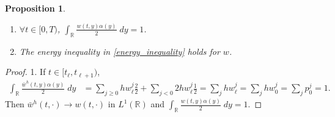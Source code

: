 \documentclass[a4paper,11pt]{article}
\newtheorem{proposition}{Proposition}[section]
\theoremstyle{remark}
\begin{document}
\begin{proposition}
\begin{enumerate}
 \item $\forall t\in[0,T)$, $\int_\mathbb{R} \frac{w(t,y)\alpha(y)}{2}\;dy = 1$.
 \item The energy inequality in \eqref{energy_inequality} holds for $w$.
\end{enumerate}
\end{proposition}
\begin{proof}
1. If $t\in [t_\ell, t_{\ell+1})$,
\begin{align*}
\int_\mathbb{R} \frac{\bar{w}^h(t,y)\alpha(y)}{2} \; dy &= \sum_{j\ge0} h w^j_\ell \frac{2}{2} + \sum_{j<0} 2h w^j_\ell \frac{1}{2} = \sum_j h w^j_\ell = \sum_j h w^j_0=\sum_j p^j_0 = 1. 
\end{align*}
Then $\bar{w}^h(t,\cdot) \rightarrow w(t,\cdot)$ in $L^1(\mathbb{R})$ and $\displaystyle\int_\mathbb{R} \frac{w(t,y)\alpha(y)}{2} \; dy = 1.$


\end{proof}
\end{document}
